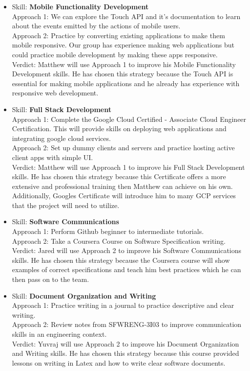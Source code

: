 \documentclass[12pt]{article}
\begin{document}
\begin{itemize}
		\item Skill: \textbf{Mobile Functionality Development}
		\\ Approach 1: We can explore the Touch API and it's documentation to learn about the events emitted by the actions of mobile users.
		\\ Approach 2: Practice by converting existing applications to make them mobile responsive. Our group has experience making web applications but could practice mobile development by making these apps responsive.
		\\ Verdict: Matthew will use Approach 1 to improve his Mobile Functionality Development skills. He has chosen this strategy because the Touch API is essential for making mobile applications and he already has experience with responsive web development.
		
		\item Skill: \textbf{Full Stack Development}
		\\ Approach 1: Complete the Google Cloud Certified - Associate Cloud Engineer Certification. This will provide skills on deploying web applications and integrating google cloud services.
		\\ Approach 2: Set up dummy clients and servers and practice hosting active client apps with simple UI.
		\\ Verdict: Matthew will use Approach 1 to improve his Full Stack Development skills. He has chosen this strategy because this Certificate offers a more extensive and professional training then Matthew can achieve on his own. Additionally, Googles Certificate will introduce him to many GCP services that the project will need to utilize.
		
		\item Skill: \textbf{Software Communications}
		\\ Approach 1: Perform Github beginner to intermediate tutorials.
		\\ Approach 2: Take a Coursera Course on Software Specification writing.
		\\ Verdict: Jared will use Approach 2 to improve his Software Communications skills. He has chosen this strategy because the Coursera course will show examples of correct specifications and teach him best practices which he can then pass on to the team.
		
		\item Skill: \textbf{Document Organization and Writing}
		\\ Approach 1: Practice writing in a journal to practice descriptive and clear writing.
		\\ Approach 2: Review notes from SFWRENG-3I03 to improve communication skills in an engineering context.
		\\ Verdict: Yuvraj will use Approach 2 to improve his Document Organization and Writing skills. He has chosen this strategy because this course provided lessons on writing in Latex and how to write clear software documents. 
		

\end{itemize}
\end{document}
